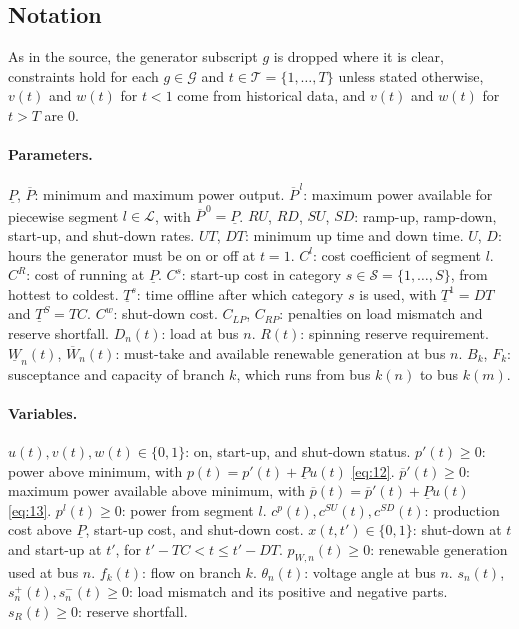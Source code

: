 \documentclass[11pt]{article}
\newcommand{\Pmax}{\overline{P}}
\newcommand{\Pmin}{\underline{P}}
\newcommand{\pbar}{\overline{p}}
\begin{document}
\subsection{Notation}
\label{app:notation}

As in the source, the generator subscript $g$ is dropped where it is clear, constraints hold for each $g \in \mathcal{G}$ and $t \in \mathcal{T} = \{1,\dots,T\}$ unless stated otherwise, $v(t)$ and $w(t)$ for $t<1$ come from historical data, and $v(t)$ and $w(t)$ for $t>T$ are $0$.

\paragraph{Parameters.}
$\Pmin$, $\Pmax$: minimum and maximum power output.
$\Pmax^{\,l}$: maximum power available for piecewise segment $l \in \mathcal{L}$, with $\Pmax^{\,0}=\Pmin$.
$RU$, $RD$, $SU$, $SD$: ramp-up, ramp-down, start-up, and shut-down rates.
$UT$, $DT$: minimum up time and down time.
$U$, $D$: hours the generator must be on or off at $t=1$.
$C^l$: cost coefficient of segment $l$.
$C^R$: cost of running at $\Pmin$.
$C^s$: start-up cost in category $s \in \mathcal{S}=\{1,\dots,S\}$, from hottest to coldest.
$\underline{T}^s$: time offline after which category $s$ is used, with $\underline{T}^1 = DT$ and $\underline{T}^S = TC$.
$C^w$: shut-down cost.
$C_{LP}$, $C_{RP}$: penalties on load mismatch and reserve shortfall.
$D_n(t)$: load at bus $n$.
$R(t)$: spinning reserve requirement.
$\underline{W}_n(t)$, $\overline{W}_n(t)$: must-take and available renewable generation at bus $n$.
$B_k$, $F_k$: susceptance and capacity of branch $k$, which runs from bus $k(n)$ to bus $k(m)$.

\paragraph{Variables.}
$u(t), v(t), w(t) \in \{0,1\}$: on, start-up, and shut-down status.
$p'(t) \ge 0$: power above minimum, with $p(t) = p'(t) + \Pmin u(t)$ \eqref{eq:12}.
$\pbar'(t) \ge 0$: maximum power available above minimum, with $\pbar(t) = \pbar'(t) + \Pmin u(t)$ \eqref{eq:13}.
$p^l(t) \ge 0$: power from segment $l$.
$c^p(t), c^{SU}(t), c^{SD}(t)$: production cost above $\Pmin$, start-up cost, and shut-down cost.
$x(t,t') \in \{0,1\}$: shut-down at $t$ and start-up at $t'$, for $t'-TC < t \le t'-DT$.
$p_{W,n}(t) \ge 0$: renewable generation used at bus $n$.
$f_k(t)$: flow on branch $k$.
$\theta_n(t)$: voltage angle at bus $n$.
$s_n(t)$, $s_n^+(t), s_n^-(t) \ge 0$: load mismatch and its positive and negative parts.
$s_R(t) \ge 0$: reserve shortfall.
\end{document}

